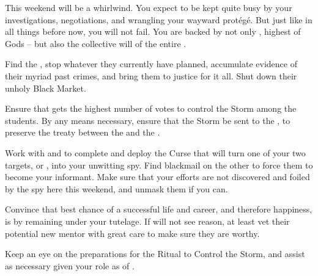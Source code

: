 \documentclass[char]{GL2020}
\begin{document}
This weekend will be a whirlwind. You expect to be kept quite busy by your investigations, negotiations, and wrangling your wayward protégé. But just like in all things before now, you will not fail. You are backed by not only \cTechGod{}, highest of Gods -- but also the collective will of the entire \pTech{}.

\begin{itemz}
	\item Find the \pGoaties{}, stop whatever they currently have planned, accumulate evidence of their myriad past crimes, and bring them to justice for it all. Shut down their unholy Black Market.
	\item Ensure that \cScholarship{} gets the highest number of votes to control the Storm among the \pTech{} students. By any means necessary, ensure that the Storm be sent to the \pShip{}, to preserve the treaty between the \pFarm{} and the \pTech{}.
	\item Work with \cScholarship{} and \cPrince{} to complete and deploy the Curse that will turn one of your two \pShip{} targets, \cInitiate{} or \cPirate{}, into your unwitting spy. Find blackmail on the other to force them to become your informant. Make sure that your efforts are not discovered and foiled by the \pShip{} spy here this weekend, and unmask them if you can.
	\item Convince \cScholarship{} that \cScholarship{\their} best chance of a successful life and career, and therefore happiness, is by remaining under your tutelage. If \cScholarship{\they} will not see reason, at least vet their potential new mentor with great care to make sure they are worthy.
	\item Keep an eye on the preparations for the Ritual to Control the Storm, and assist as necessary given your role as \cAntiChup{\cleric} of \cTechGod{}. 
\end{itemz}
\end{document}
